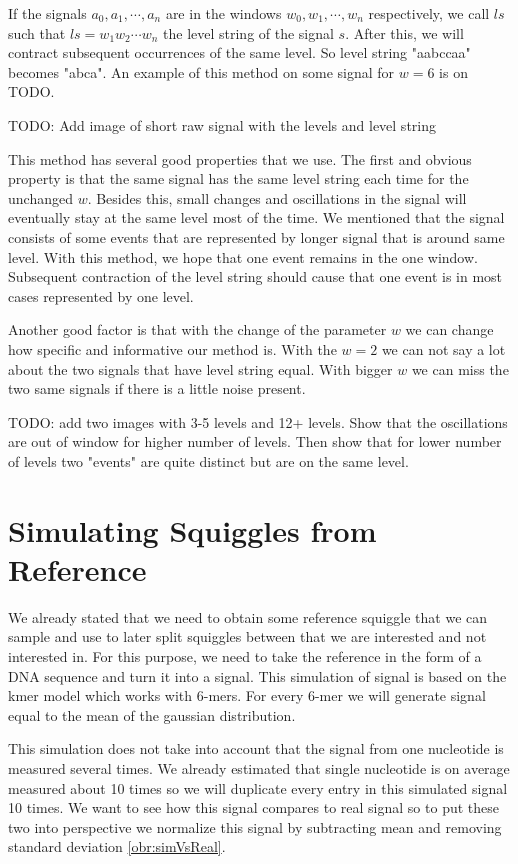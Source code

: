 If the signals $a_0, a_1, \cdots, a_n$ are in the windows $w_0, w_1, \cdots ,w_n$
respectively, we call $ls$ such that $ls=w_1w_2\cdots w_n$ the level string of the
signal $s$. After this, we will contract subsequent occurrences of the same level.
So level string "aabccaa" becomes "abca". An example of this method on some signal
for $w=6$ is on TODO. 

TODO: Add image of short raw signal with the levels and level string

This method has several good properties that we use. The first and obvious
property is that the same signal has the same level string each time for the unchanged $w$. Besides this, small changes and
oscillations in the signal will eventually stay at the same level most of the time.
We mentioned that the signal consists of some events that are represented by longer signal that is around same level.
With this method, we hope that one event remains in the one window. Subsequent
contraction of the level string should cause that one event is in most cases represented by
one level.

Another good factor is that with the change of the parameter $w$ we can change how specific
and informative our method is. With the $w=2$ we can not say a lot about the two signals
that have level string equal. With bigger $w$ we can miss the two same signals
if there is a little noise present.

TODO: add two images with 3-5 levels and 12+ levels. Show that the oscillations are
out of window for higher number of levels. Then show that for lower number of levels
two "events" are quite distinct but are on the same level.

\section{Simulating Squiggles from Reference}

We already stated that we need to obtain some reference squiggle that we
can sample and use to later split squiggles between that we are interested and not
interested in. For this purpose, we need to take the reference in the form of a DNA sequence
and turn it into a signal. This simulation of signal is based on the kmer model
which works with 6-mers. For every 6-mer we will generate signal equal to the mean
of the gaussian distribution.

This simulation does not take into account that the signal from one nucleotide is
measured several times. We already estimated that single nucleotide is on average
measured about 10 times so we will duplicate every entry in this simulated signal
10 times. We want to see how this signal compares to real signal so to put these
two into perspective we normalize this signal by subtracting mean and removing
standard deviation \ref{obr:simVsReal}.

